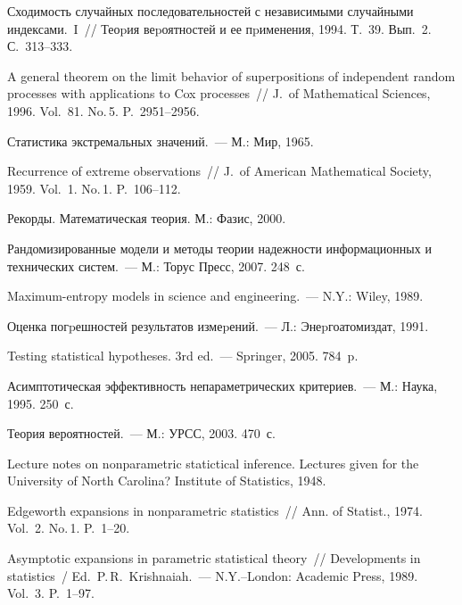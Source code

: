 \begin{multicols}{2}
{{\begin{thebibliography}{99}
Сходимость случайных последовательностей с независимыми
случайными индексами.~I~// Теоpия веpоятностей и ее
пpименения, 1994. Т.~39. Вып.~2. С.~313--333.

A general theorem on the limit behavior of
superpositions of independent random processes with applications
to Cox processes~// J.\ of Mathematical Sciences, 1996.
Vol.~81. No.\,5. P.~2951--2956.

Статистика экстремальных значений.~--- М.: Мир, 1965.

Recurrence of extreme observations~//
J.\ of American Mathematical Society, 1959. Vol.~1. No.\,1. P.~106--112.

Рекорды. Математическая теория.
М.: Фазис, 2000.

Рандомизированные модели и методы теории надежности информационных
и технических систем.~--- М.: Торус Пресс, 2007. 248~с.

Maximum-entropy models in science and
engineering.~--- N.Y.: Wiley, 1989.

Оценка погpешностей результатов
измеpений.~---  Л.: Энеpгоатомиздат, 1991.

Testing statistical hypotheses. 3rd ed.~---
Springer, 2005. 784~p.

Асимптотическая эффективность
непараметрических критериев.~---  М.: Наука, 1995. 250~с.

Теория вероятностей.~--- М.: УРСС, 2003. 470~с.

Lecture notes on nonparametric statictical inference. Lectures given for the
University of North Carolina? Institute of Statistics, 1948.

 Edgeworth expansions in nonparametric statistics~//
  Ann. of Statist., 1974. Vol.~2. No.\,1. P.~1--20.
  
  Asymptotic expansions in parametric statistical theory~// Developments in statistics~/ Ed.\
  P.\,R.~Krishnaiah.~--- N.Y.--London: Academic Press, 1989. Vol.~3. P.~1--97.
  

\end{thebibliography}}}
\end{multicols}
